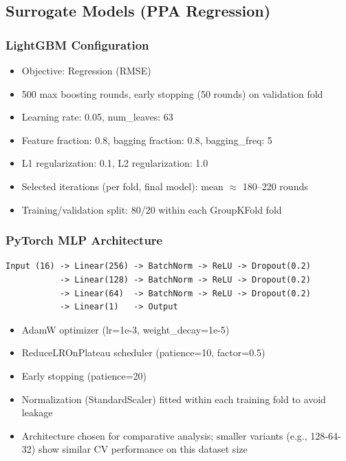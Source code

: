 \documentclass[10pt,conference]{IEEEtran}
\begin{document}
\subsection{Surrogate Models (PPA Regression)}
\label{sec:surrogate_models}

\subsubsection{LightGBM Configuration}
\begin{itemize}
    \item Objective: Regression (RMSE)
    \item 500 max boosting rounds, early stopping (50 rounds) on validation fold
    \item Learning rate: 0.05, num\_leaves: 63
    \item Feature fraction: 0.8, bagging fraction: 0.8, bagging\_freq: 5
    \item L1 regularization: 0.1, L2 regularization: 1.0
    \item Selected iterations (per fold, final model): mean $\approx$ 180--220 rounds
    \item Training/validation split: 80/20 within each GroupKFold fold
\end{itemize}

\subsubsection{PyTorch MLP Architecture}
\begin{Verbatim}[breaklines=true,breakanywhere=true]
Input (16) -> Linear(256) -> BatchNorm -> ReLU -> Dropout(0.2)
           -> Linear(128) -> BatchNorm -> ReLU -> Dropout(0.2)
           -> Linear(64)  -> BatchNorm -> ReLU -> Dropout(0.2)
           -> Linear(1)   -> Output
\end{Verbatim}
\begin{itemize}
    \item AdamW optimizer (lr=1e-3, weight\_decay=1e-5)
    \item ReduceLROnPlateau scheduler (patience=10, factor=0.5)
    \item Early stopping (patience=20)
    \item Normalization (StandardScaler) fitted within each training fold to avoid leakage
    \item Architecture chosen for comparative analysis; smaller variants (e.g., 128-64-32) show similar CV performance on this dataset size
\end{itemize}
\end{document}
